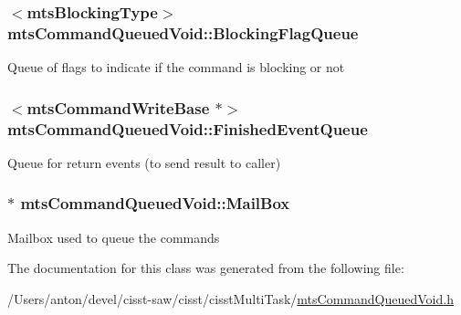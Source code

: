 \subsubsection[{Blocking\+Flag\+Queue}]{$<${\bf mts\+Blocking\+Type}$>$ mts\+Command\+Queued\+Void\+::\+Blocking\+Flag\+Queue\hspace{0.3cm}{\ttfamily [protected]}}\label{classmts_command_queued_void_aefa9eea10dadece42a79902c0e3dc50f}
Queue of flags to indicate if the command is blocking or not \hypertarget{classmts_command_queued_void_a292d6fd53236a3143e1182f248d1621d}{}
\subsubsection[{Finished\+Event\+Queue}]{$<${\bf mts\+Command\+Write\+Base} $\ast$$>$ mts\+Command\+Queued\+Void\+::\+Finished\+Event\+Queue\hspace{0.3cm}{\ttfamily [protected]}}\label{classmts_command_queued_void_a292d6fd53236a3143e1182f248d1621d}
Queue for return events (to send result to caller) \hypertarget{classmts_command_queued_void_a44473994b2785131ab7c0f9974858ff0}{}
\subsubsection[{Mail\+Box}]{$\ast$ mts\+Command\+Queued\+Void\+::\+Mail\+Box\hspace{0.3cm}{\ttfamily [protected]}}\label{classmts_command_queued_void_a44473994b2785131ab7c0f9974858ff0}
Mailbox used to queue the commands 

The documentation for this class was generated from the following file\+:\begin{DoxyCompactItemize}
\item 
/\+Users/anton/devel/cisst-\/saw/cisst/cisst\+Multi\+Task/\hyperlink{mts_command_queued_void_8h}{mts\+Command\+Queued\+Void.\+h}\end{DoxyCompactItemize}
